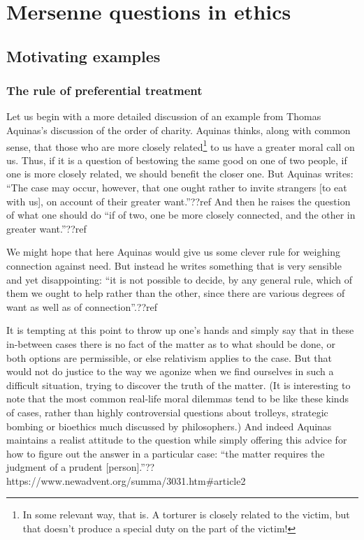 
\def\mychapter{II}

\chapter{Mersenne questions in ethics}\label{ch:ethics}
\section{Motivating examples}
\subsection{The rule of preferential treatment}
Let us begin with a more detailed discussion of an example from Thomas Aquinas's discussion of the order of charity. Aquinas thinks,
along with common sense, that those who are more closely related\footnote{In some relevant way, that is.
A torturer is closely related to the victim, but that doesn't produce a special duty on the part of the victim!} to 
us have a greater moral call on us.
Thus, if it is a question of bestowing the same good on one of two people, if one is more closely related,
we should benefit the closer one. But Aquinas writes: ``The case may occur, however, that one 
ought rather to invite strangers [to eat with us], on 
account of their greater want.''??ref And then he raises the question of what one should do ``if of two, one be 
more closely connected, and the other in greater want.''??ref

We might hope that here Aquinas would give us some clever rule for weighing connection against need. But 
instead he writes something that is very sensible and yet disappointing: ``it is not possible to decide, by any general rule, which of them we ought 
to help rather than the other, since there are various degrees of want as well as of connection''.??ref 

It is
tempting at this point to throw up one's hands and simply say that in these in-between cases there is no
fact of the matter as to what should be done, or both options are permissible, or else relativism applies
to the case. But that would not do justice to the way we agonize when we find ourselves in such a difficult 
situation, trying to discover the truth of the matter. (It is interesting to note that the most common real-life moral dilemmas
tend to be like these kinds of cases, rather than highly controversial questions about trolleys, strategic bombing or
bioethics much discussed by philosophers.)
And indeed Aquinas maintains a realist attitude to
the question while simply offering this advice for how to figure out the answer in a particular case: ``the matter 
requires the judgment of a prudent [person].''??https://www.newadvent.org/summa/3031.htm\#article2

